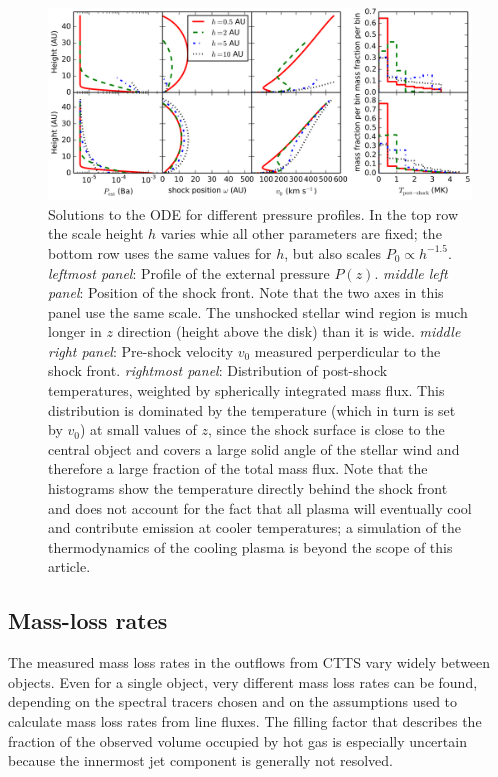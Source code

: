 \documentclass{emulateapj}
\begin{document}
\begin{figure}[h!]
\begin{center}
\includegraphics[width=1\columnwidth]{figures/P_ext/P_ext.png}
\caption{\label{fig:p_ext}
Solutions to the ODE for different pressure profiles. In the top row the scale height $h$ varies whie all other parameters are fixed; the bottom row uses the same values for $h$, but also scales $P_0\propto h^{-1.5}$.
\emph{leftmost panel}: Profile of the external pressure $P(z)$. 
\emph{middle left panel}: Position of the shock front. Note that the two axes in this panel use the same scale. The unshocked stellar wind region is much longer in $z$ direction (height above the disk) than it is wide. 
\emph{middle right panel}: Pre-shock velocity $v_0$ measured perperdicular to the shock front. 
\emph{rightmost panel}: Distribution of post-shock temperatures, weighted by spherically integrated mass flux. This distribution is dominated by the temperature (which in turn is set by $v_0$) at small values of $z$, since the shock surface is close to the central object and covers a large solid angle of the stellar wind and therefore a large fraction of the total mass flux. Note that the histograms show the temperature directly behind the shock front and does not account for the fact that all plasma will eventually cool and contribute emission at cooler temperatures; a simulation of the thermodynamics of the cooling plasma is beyond the scope of this article.}
\end{center}
\end{figure}

\subsection{Mass-loss rates}
\label{sect:masslossrates}
The measured mass loss rates in the outflows from CTTS vary widely between objects.  Even for a single object, very different mass loss rates can be found, depending on the spectral tracers chosen and on the assumptions used to calculate mass loss rates from line fluxes. The filling factor that describes the fraction of the observed volume occupied by hot gas is especially uncertain because the innermost jet component is generally not resolved.
\end{document}
